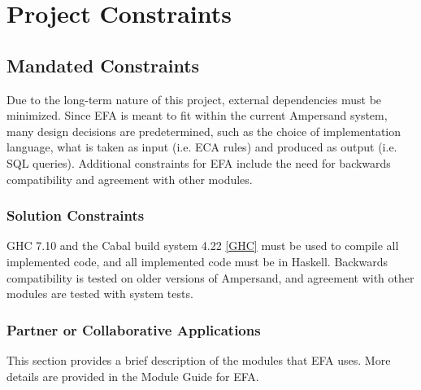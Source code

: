 \documentclass[12pt]{report}
\begin{document}
\chapter{Project Constraints}\label{ch:Constraints}


\section{Mandated Constraints}\label{sec:Constraints}
Due to the long-term nature of this project, external dependencies must be 
minimized. Since EFA is meant to fit within the current Ampersand system, many 
design decisions are predetermined, such as the choice of implementation 
language, what is taken as input (i.e. ECA rules) and produced as output (i.e. 
SQL queries). Additional constraints for EFA include the need for backwards 
compatibility and agreement with other modules.
\subsection{Solution Constraints}\label{subsec:SolutionConstraints}
GHC 7.10  and the Cabal build system 4.22 \ref{GHC} must be used to compile all 
implemented code, and all implemented code must be in Haskell. Backwards 
compatibility is tested on older versions of Ampersand, and agreement with 
other modules are tested with system tests.

\subsection{Partner or Collaborative Applications}\label{subsec:Collaborative}
This section provides a brief description of the modules that EFA uses. More 
details are provided in the Module Guide for EFA.
\end{document}
